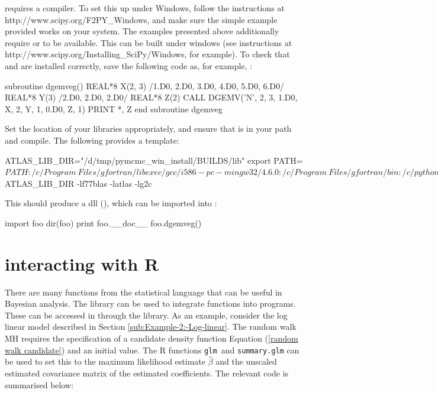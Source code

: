 \documentclass[article]{jss}
\begin{document}
 requires a  compiler. To set this up
under Windows, follow the instructions at
http://www.scipy.org/F2PY\_Windows, and make sure the simple example
provided works on your system. The examples presented above
additionally require  or \mbox{} to be available.
This can be built under windows (see instructions at \linebreak
http://www.scipy.org/Installing\_SciPy/Windows, for example). To check
that  and \mbox{} are installed correctly, save
the following code as, for example, :


\begin{Code}
subroutine dgemveg()
  REAL*8 X(2, 3) /1.D0, 2.D0, 3.D0, 4.D0, 5.D0, 6.D0/
  REAL*8 Y(3) /2.D0, 2.D0, 2.D0/
  REAL*8 Z(2)
  CALL DGEMV('N', 2, 3, 1.D0, X, 2, Y, 1, 0.D0, Z, 1)
  PRINT *, Z
end subroutine dgemveg
\end{Code}



Set the location of your  libraries appropriately, and ensure
that  is in your path and compile. The following provides a
template:


\begin{Code}
ATLAS_LIB_DIR="/d/tmp/pymcmc_win_install/BUILDS/lib"
export PATH=${PATH}:/c/Program\ Files/gfortran/libexec/gcc/i586-pc-mingw32/4.6.0:/c/Program\ Files/gfortran/bin:/c/python26 
python /c/Python26/Scripts/f2py.py -c -m foo \
   --fcompiler=gfortran \
   blas_eg.f90 -L${ATLAS_LIB_DIR} -lf77blas -latlas -lg2c 
\end{Code}


This should produce a  dll (), which can be imported
into :


\begin{Code}
import foo
dir(foo) 
print foo.__doc__
foo.dgemveg() 
\end{Code}

\section[PyMCMC interacting with R]{ interacting with R}
\label{sec:PyMCMC-interacting-with}

There are many functions from the  statistical language
\citep{R} that can be useful in Bayesian analysis. The 
\citep{gautier:_rpy2}  library can be used to
integrate \proglang{R} functions into \pkg{PyMCMC} programs. These can
be accessed in \pkg{PyMCMC} through the \pkg{RPy2} \proglang{Python}
library. As an example, consider the log linear model described in
Section \ref{sub:Example-2:-Log-linear}. The random walk MH requires
the specification of a candidate density function Equation
(\ref{random walk candidate}) and an initial value. The R functions
\texttt{glm }and \texttt{summary.glm} can be used to set this to the
maximum likelihood estimate $\hat{\beta}$ and the unscaled estimated
covariance matrix of the estimated coefficients. The relevant code is
summarised below:
\end{document}
